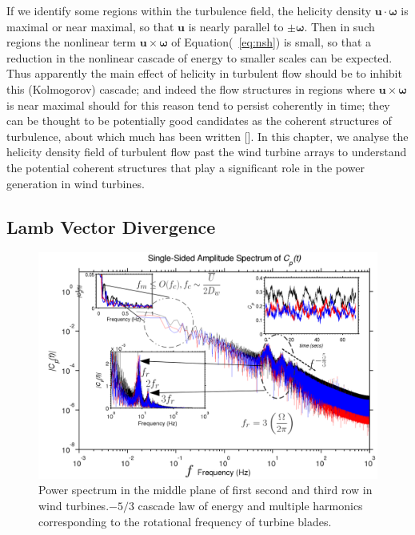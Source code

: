 If we identify some regions within the turbulence field, the helicity density $\pmb{u}\cdot\pmb{\omega}$ is maximal or near maximal, so that $\pmb{u}$ is nearly parallel to $\pm \pmb{\omega}$. Then in such regions the nonlinear term $\pmb{u}\times \pmb{\omega}$ of Equation(~\ref{eq:nsh}) is small, so that a reduction in the nonlinear cascade of energy to smaller scales can be expected. Thus apparently the main effect of helicity in turbulent flow should be to inhibit this (Kolmogorov) cascade; and indeed the flow structures in regions where $\pmb{u}\times \pmb{\omega}$ is near maximal should for this
reason tend to persist coherently in time; they can be thought to be potentially good candidates as the coherent structures of turbulence, about which much has been written [].
In this chapter, we analyse the helicity density field of turbulent flow past the wind turbine arrays to understand the potential coherent structures that play a significant role in the power generation in wind turbines.
\subsection{Lamb Vector Divergence}

\begin{figure}
\includegraphics[width = 0.95\linewidth]{Figure/power_2.png}
\caption[Power Spectrum]{Power spectrum in the middle plane of first second and third row in wind turbines.$-5/3$ cascade law of energy and multiple harmonics corresponding to the rotational frequency of turbine blades. } \label{fig:power2}
\end{figure}
